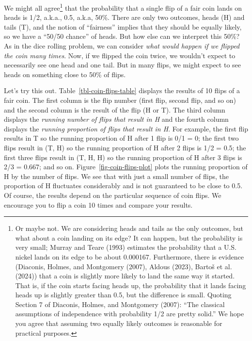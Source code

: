 \documentclass[
  letterpaper,
  DIV=11,
  numbers=noendperiod]{scrreprt}
\theoremstyle{plain}
\theoremstyle{definition}
\theoremstyle{definition}
\theoremstyle{definition}
\theoremstyle{remark}
\begin{document}
We might all agree\footnote{Or maybe not. We are considering heads and
  tails as the only outcomes, but what about a coin landing on its edge?
  It can happen, but the probability is very small; Murray and Teare
  (1993) estimates the probability that a U.S. nickel lands on its edge
  to be about 0.000167. Furthermore, there is evidence (Diaconis,
  Holmes, and Montgomery (2007), Aldous (2023), Bartoš et al. (2024))
  that a coin is slightly more likely to land the same way it started.
  That is, if the coin starts facing heads up, the probability that it
  lands facing heads up is slightly greater than 0.5, but the difference
  is small. Quoting Section 7 of Diaconis, Holmes, and Montgomery
  (2007): ``The classical assumptions of independence with probability
  1/2 are pretty solid.'' We hope you agree that assuming two equally
  likely outcomes is reasonable for practical purposes.} that the
probability that a single flip of a fair coin lands on heads is 1/2,
a.k.a., 0.5, a.k.a, 50\%. There are only two outcomes, heads (H) and
tails (T), and the notion of ``fairness'' implies that they should be
equally likely, so we have a ``50/50 chance'' of heads. But how else can
we interpret this 50\%? As in the dice rolling problem, we can consider
\emph{what would happen if we flipped the coin many times}. Now, if we
flipped the coin twice, we wouldn't expect to necessarily see one head
and one tail. But in many flips, we might expect to see heads on
something close to 50\% of flips.

Let's try this out. Table~\ref{tbl-coin-flips-table} displays the
results of 10 flips of a fair coin. The first column is the flip number
(first flip, second flip, and so on) and the second column is the result
of the flip (H or T). The third column displays the \emph{running number
of flips that result in H} and the fourth column displays the
\emph{running proportion of flips that result in H}. For example, the
first flip results in T so the running proportion of H after 1 flip is
0/1 = 0; the first two flips result in (T, H) so the running proportion
of H after 2 flips is 1/2 = 0.5; the first three flips result in (T, H,
H) so the running proportion of H after 3 flips is 2/3 = 0.667; and so
on. Figure~\ref{fig-coin-flips-plot} plots the running proportion of H
by the number of flips. We see that with just a small number of flips,
the proportion of H fluctuates considerably and is not guaranteed to be
close to 0.5. Of course, the results depend on the particular sequence
of coin flips. We encourage you to flip a coin 10 times and compare your
results.
\end{document}
